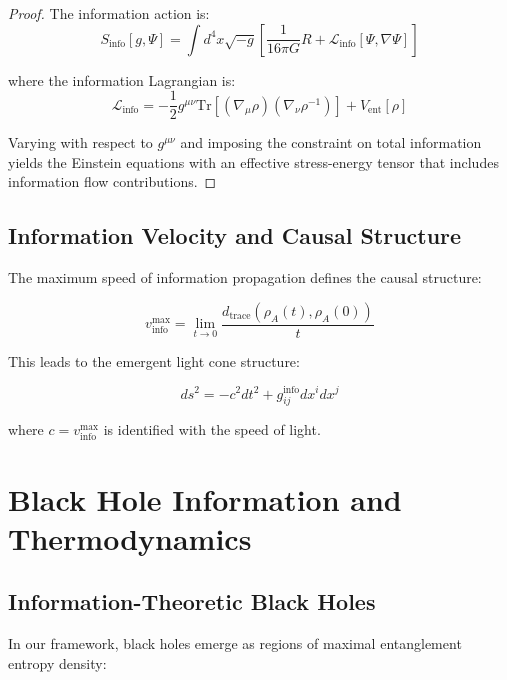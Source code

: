 \documentclass[12pt,a4paper]{article}
\begin{document}
\begin{proof}
The information action is:
\begin{equation}
S_{\text{info}}[g, \Psi] = \int d^4x \sqrt{-g} \left[\frac{1}{16\pi G} R + \mathcal{L}_{\text{info}}[\Psi, \nabla\Psi]\right]
\end{equation}

where the information Lagrangian is:
\begin{equation}
\mathcal{L}_{\text{info}} = -\frac{1}{2} g^{\mu\nu} \text{Tr}\left[(\nabla_\mu \rho)(\nabla_\nu \rho^{-1})\right] + V_{\text{ent}}[\rho]
\end{equation}

Varying with respect to $g^{\mu\nu}$ and imposing the constraint on total information yields the Einstein equations with an effective stress-energy tensor that includes information flow contributions.
\end{proof}

\subsection{Information Velocity and Causal Structure}

The maximum speed of information propagation defines the causal structure:

\begin{equation}
v_{\text{info}}^{\max} = \lim_{t \to 0} \frac{d_{\text{trace}}(\rho_A(t), \rho_A(0))}{t}
\end{equation}

This leads to the emergent light cone structure:

\begin{equation}
ds^2 = -c^2 dt^2 + g_{ij}^{\text{info}} dx^i dx^j
\end{equation}

where $c = v_{\text{info}}^{\max}$ is identified with the speed of light.

\section{Black Hole Information and Thermodynamics}

\subsection{Information-Theoretic Black Holes}

In our framework, black holes emerge as regions of maximal entanglement entropy density:
\end{document}
